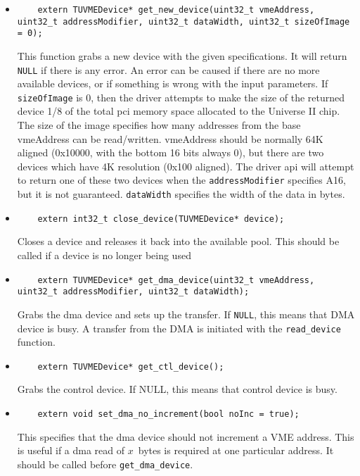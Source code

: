 			\begin{itemize}
			\item\begin{lstlisting}
	extern TUVMEDevice* get_new_device(uint32_t vmeAddress, uint32_t addressModifier, uint32_t dataWidth, uint32_t sizeOfImage = 0);
			\end{lstlisting}
  This function grabs a new device with the given specifications. It will return \lstinline!NULL! if there is any error. 
  An error can be caused if there are no more available devices, or if something is wrong with the input parameters. 
  If \lstinline!sizeOfImage! is 0, then the driver attempts to make the size of the returned device 1/8 of the total pci memory
  space allocated to the Universe II chip. 
  The size of the image specifies how many addresses from the base vmeAddress can be read/written. 
  vmeAddress should be normally 64K aligned (0x10000, with the bottom 16 bits always 0), but there are 
  two devices which have 4K resolution (0x100 aligned).  The driver api will attempt to return one of these
  two devices when the \lstinline!addressModifier! specifies A16, but it is not guaranteed.  
  \lstinline!dataWidth! specifies the width of the data in bytes. 

			\item\begin{lstlisting}
	extern int32_t close_device(TUVMEDevice* device);
			\end{lstlisting}
Closes a device and releases it back into the available pool.  This should be called if a device is no longer being used

			\item\begin{lstlisting}
	extern TUVMEDevice* get_dma_device(uint32_t vmeAddress, uint32_t addressModifier, uint32_t dataWidth);
			\end{lstlisting}
Grabs the dma device and sets up the transfer.  If \lstinline!NULL!, this means that DMA device is busy.
A transfer from the DMA is initiated with the \lstinline!read_device! function.

			\item\begin{lstlisting}
	extern TUVMEDevice* get_ctl_device();
			\end{lstlisting}
Grabs the control device.  If NULL, this means that control device is busy.

			\item\begin{lstlisting}
	extern void set_dma_no_increment(bool noInc = true);
			\end{lstlisting}
This specifies that the dma device should not increment a VME address. This is useful if a dma read
of $x$~bytes is required at one particular address.  It should be called before \lstinline!get_dma_device!.


\end{itemize}

